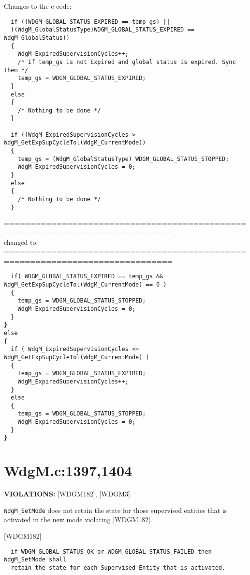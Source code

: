 \documentclass[11pt,a4paper]{article}
\begin{document}
\lstset{language=c}

Changes to the c-code:
\begin{lstlisting}
  if ((WDGM_GLOBAL_STATUS_EXPIRED == temp_gs) ||
  ((WdgM_GlobalStatusType)WDGM_GLOBAL_STATUS_EXPIRED == WdgM_GlobalStatus))
  {
    WdgM_ExpiredSupervisionCycles++;
    /* If temp_gs is not Expired and global status is expired. Sync them */
    temp_gs = WDGM_GLOBAL_STATUS_EXPIRED;
  }
  else
  {
    /* Nothing to be done */
  }

  if ((WdgM_ExpiredSupervisionCycles > WdgM_GetExpSupCycleTol(WdgM_CurrentMode))
  {
    temp_gs = (WdgM_GlobalStatusType) WDGM_GLOBAL_STATUS_STOPPED;
    WdgM_ExpiredSupervisionCycles = 0;
  }
  else
  {
    /* Nothing to be done */
  }
\end{lstlisting}
==============================================================================\\
changed to:\\
==============================================================================
\begin{lstlisting}
  if( WDGM_GLOBAL_STATUS_EXPIRED == temp_gs && WdgM_GetExpSupCycleTol(WdgM_CurrentMode) == 0 )
  {
    temp_gs = WDGM_GLOBAL_STATUS_STOPPED;
    WdgM_ExpiredSupervisionCycles = 0;
  }
}
else
{
  if ( WdgM_ExpiredSupervisionCycles <= WdgM_GetExpSupCycleTol(WdgM_CurrentMode) )
  {
    temp_gs = WDGM_GLOBAL_STATUS_EXPIRED;
    WdgM_ExpiredSupervisionCycles++;
  }
  else
  {
    temp_gs = WDGM_GLOBAL_STATUS_STOPPED;
    WdgM_ExpiredSupervisionCycles = 0;
  }
}
\end{lstlisting}
\newpage

\section{WdgM.c:1397,1404}
\textbf{VIOLATIONS:} [WDGM182], [WDGM3]\\

\lstset{language=autosar}

\lstinline!WdgM_SetMode! does not retain the state for those supervised entities
that is activated in the new mode violating [WDGM182].

[WDGM182]
\begin{lstlisting}
  if WDGM_GLOBAL_STATUS_OK or WDGM_GLOBAL_STATUS_FAILED then WdgM_SetMode shall
  retain the state for each Supervised Entity that is activated.
\end{lstlisting}~\\
\end{document}
